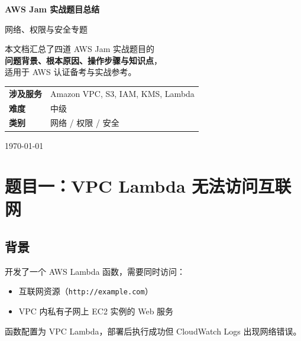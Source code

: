 \documentclass[12pt, a4paper]{article}
\begin{document}
\begin{titlepage}
    \centering
    \vspace*{2cm}
    {\Huge\bfseries\color{awsdark} AWS Jam 实战题目总结\par}
    \vspace{0.5cm}
    {\Large\color{gray} 网络、权限与安全专题\par}
    \vspace{2cm}
    \begin{tcolorbox}[colback=awsorange!15, colframe=awsorange, width=0.8\textwidth]
        \centering
        本文档汇总了四道 AWS Jam 实战题目的\\
        \textbf{问题背景、根本原因、操作步骤与知识点}，\\
        适用于 AWS 认证备考与实战参考。
    \end{tcolorbox}
    \vspace{2cm}
    \begin{tabular}{ll}
        \textbf{涉及服务} & Amazon VPC, S3, IAM, KMS, Lambda \\
        \textbf{难度} & 中级 \\
        \textbf{类别} & 网络 / 权限 / 安全 \\
    \end{tabular}
    \vfill
    {\color{gray}\today}
\end{titlepage}

\tableofcontents
\newpage

\section{题目一：VPC Lambda 无法访问互联网}

\subsection{背景}

开发了一个 AWS Lambda 函数，需要同时访问：
\begin{itemize}
    \item 互联网资源（\texttt{http://example.com}）
    \item VPC 内私有子网上 EC2 实例的 Web 服务
\end{itemize}

函数配置为 VPC Lambda，部署后执行成功但 CloudWatch Logs 出现网络错误。
\end{document}
